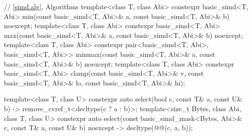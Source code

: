 \begin{codeblock}
{  // \ref{simd.alg}, Algorithms
  template<class T, class Abi>
    constexpr basic_simd<T, Abi>
      min(const basic_simd<T, Abi>& a, const basic_simd<T, Abi>& b) noexcept;
  template<class T, class Abi>
    constexpr basic_simd<T, Abi>
      max(const basic_simd<T, Abi>& a, const basic_simd<T, Abi>& b) noexcept;
  template<class T, class Abi>
    constexpr pair<basic_simd<T, Abi>, basic_simd<T, Abi>>
      minmax(const basic_simd<T, Abi>& a, const basic_simd<T, Abi>& b) noexcept;
  template<class T, class Abi>
    constexpr basic_simd<T, Abi>
      clamp(const basic_simd<T, Abi>& v, const basic_simd<T, Abi>& lo,
            const basic_simd<T, Abi>& hi);

  template<class T, class U>
    constexpr auto select(bool c, const T& a, const U& b)
    -> remove_cvref_t<decltype(c ? a : b)>;
  template<size_t Bytes, class Abi, class T, class U>
    constexpr auto select(const basic_simd_mask<Bytes, Abi>& c, const T& a, const U& b)
    noexcept -> decltype(@@(c, a, b));

}
\end{codeblock}
